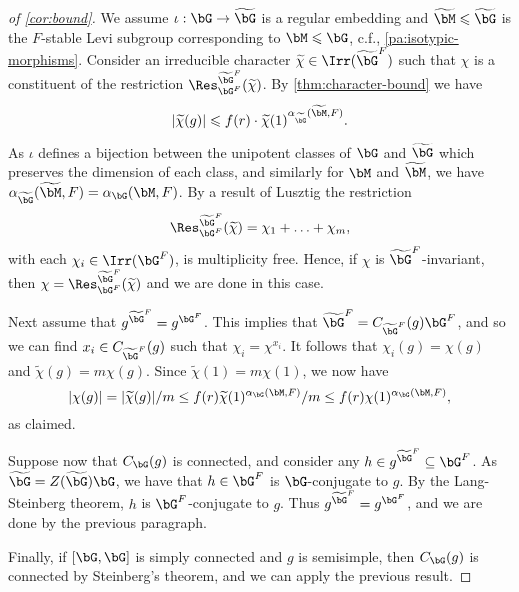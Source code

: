 \documentclass[eqthmnum,nocolour,skinny]{jt-calcs}
\begin{document}
\begin{proof}[of \cref{cor:bound}]
We assume $\iota : \bG \to \widetilde{\bG}$ is a regular embedding and $\widetilde{\bM} \leqslant \widetilde{\bG}$ is the $F$-stable Levi subgroup corresponding to $\bM \leqslant \bG$, c.f., \cref{pa:isotypic-morphisms}. Consider an irreducible character $\widetilde{\chi} \in \Irr(\widetilde{\bG}^F)$ such that $\chi$ is a constituent of the restriction $\Res_{\bG^F}^{\widetilde{\bG}^F}(\widetilde{\chi})$. By \cref{thm:character-bound} we have
\begin{equation*}
|\widetilde{\chi}(g)| \leqslant f(r)\cdot \widetilde{\chi}(1)^{\alpha_{\widetilde{\bG}}(\widetilde{\bM},F)}.
\end{equation*}

As $\iota$ defines a bijection between the unipotent classes of $\bG$ and $\widetilde{\bG}$ which preserves the dimension of each class, and similarly for $\bM$ and $\widetilde{\bM}$, we have $\alpha_{\widetilde{\bG}}(\widetilde{\bM},F) = \alpha_{\bG}(\bM,F)$. By a result of Lusztig \cite{lusztig:1988:reductive-groups-with-a-disconnected-centre} the restriction
\begin{equation*}
\Res_{\bG^F}^{\widetilde{\bG}^F}(\widetilde{\chi}) = \chi_1 + \ldots + \chi_m,
\end{equation*}
with each $\chi_i \in \Irr(\bG^F)$, is multiplicity free. Hence, if $\chi$ is $\widetilde{\bG}^F$-invariant, then $\chi = \Res_{\bG^F}^{\widetilde{\bG}^F}(\widetilde{\chi})$ and we are done in this case.
 
Next assume that $g^{\widetilde{\bG}^F} = g^{\bG^F}$. This implies that $\widetilde{\bG}^F = C_{\widetilde{\bG}^F}(g)\bG^F$, and so
we can find $x_i \in C_{\widetilde{\bG}^F}(g)$ such that $\chi_i = \chi^{x_i}$. It follows that $\chi_i(g) = \chi(g)$ and
$\widetilde{\chi}(g) = m\chi(g)$. Since $\widetilde{\chi}(1) = m\chi(1)$, we now have
\begin{equation*}
|\chi(g)| = |\widetilde{\chi}(g)|/m \leq f(r)\widetilde{\chi}(1)^{\alpha_{\bG}(\bM,F)}/m \leq f(r)\chi(1)^{\alpha_\bG(\bM,F)},
\end{equation*}
as claimed.

Suppose now that $C_\bG(g)$ is connected, and consider any $h \in g^{\widetilde{\bG}^F} \subseteq \bG^F$. 
As $\widetilde{\bG} = Z(\widetilde{\bG})\bG$, we have that 
$h \in \bG^F$ is $\bG$-conjugate to $g$. By the Lang-Steinberg theorem, $h$ is $\bG^F$-conjugate to $g$. Thus 
$g^{\widetilde{\bG}^F} = g^{\bG^F}$, and we are done by the previous paragraph.

Finally, if $[\bG,\bG]$ is simply connected and $g$ is semisimple, then $C_\bG(g)$ is connected by Steinberg's theorem, and we 
can apply the previous result.
\end{proof}
\end{document}
